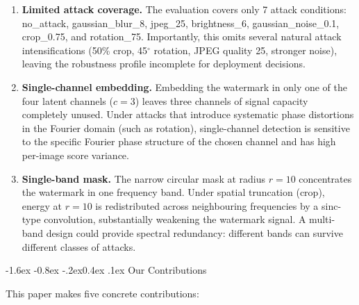 \documentclass[10pt,twocolumn]{article}
\makeatletter
\renewcommand\subsection{\@startsection{subsection}{2}{\z@}%
  {-1.6ex \@plus -0.8ex \@minus -.2ex}{0.4ex \@plus .1ex}%
  {\normalfont\normalsize\itshape}}
\makeatother
\begin{document}
\begin{enumerate}
  \item \textbf{Limited attack coverage.}
    The evaluation covers only 7 attack conditions: no\_attack,
    gaussian\_blur\_8, jpeg\_25, brightness\_6, gaussian\_noise\_0.1,
    crop\_0.75, and rotation\_75.
    Importantly, this omits several natural attack intensifications
    (50\% crop, 45$^\circ$ rotation, JPEG quality 25, stronger noise),
    leaving the robustness profile incomplete for deployment decisions.

  \item \textbf{Single-channel embedding.}
    Embedding the watermark in only one of the four latent channels
    ($c{=}3$) leaves three channels of signal capacity completely unused.
    Under attacks that introduce systematic phase distortions in the
    Fourier domain (such as rotation), single-channel detection is
    sensitive to the specific Fourier phase structure of the chosen
    channel and has high per-image score variance.

  \item \textbf{Single-band mask.}
    The narrow circular mask at radius $r = 10$ concentrates the
    watermark in one frequency band.
    Under spatial truncation (crop), energy at $r = 10$ is redistributed
    across neighbouring frequencies by a sinc-type convolution, substantially
    weakening the watermark signal.
    A multi-band design could provide spectral redundancy: different bands
    can survive different classes of attacks.
\end{enumerate}

\subsection{Our Contributions}

This paper makes five concrete contributions:
\end{document}
